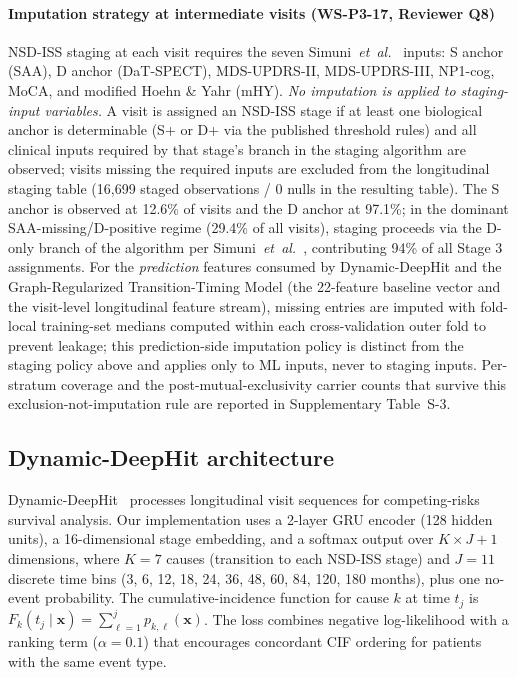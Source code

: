 \documentclass[11pt]{article}
\begin{document}
\paragraph*{Imputation strategy at intermediate visits (WS-P3-17, Reviewer Q8)} NSD-ISS staging at each visit requires the seven Simuni~\textit{et~al.}~\cite{simuni2024nsdiss} inputs: S anchor (SAA), D anchor (DaT-SPECT), MDS-UPDRS-II, MDS-UPDRS-III, NP1-cog, MoCA, and modified Hoehn \& Yahr (mHY). \emph{No imputation is applied to staging-input variables.} A visit is assigned an NSD-ISS stage if at least one biological anchor is determinable (S+ or D+ via the published threshold rules) and all clinical inputs required by that stage's branch in the staging algorithm are observed; visits missing the required inputs are excluded from the longitudinal staging table (16{,}699 staged observations / 0 nulls in the resulting table). The S anchor is observed at 12.6\% of visits and the D anchor at 97.1\%; in the dominant SAA-missing/D-positive regime (29.4\% of all visits), staging proceeds via the D-only branch of the algorithm per Simuni~\textit{et~al.}~\cite{simuni2024nsdiss}, contributing 94\% of all Stage 3 assignments. For the \emph{prediction} features consumed by Dynamic-DeepHit and the Graph-Regularized Transition-Timing Model (the 22-feature baseline vector and the visit-level longitudinal feature stream), missing entries are imputed with fold-local training-set medians computed within each cross-validation outer fold to prevent leakage; this prediction-side imputation policy is distinct from the staging policy above and applies only to ML inputs, never to staging inputs. Per-stratum coverage and the post-mutual-exclusivity carrier counts that survive this exclusion-not-imputation rule are reported in Supplementary Table~S-3.

\subsection*{Dynamic-DeepHit architecture}

Dynamic-DeepHit~\cite{lee2018deephit,lee2019} processes longitudinal visit sequences for competing-risks survival analysis. Our implementation uses a 2-layer GRU encoder (128 hidden units), a 16-dimensional stage embedding, and a softmax output over $K \times J + 1$ dimensions, where $K{=}7$ causes (transition to each NSD-ISS stage) and $J{=}11$ discrete time bins (3, 6, 12, 18, 24, 36, 48, 60, 84, 120, 180 months), plus one no-event probability. The cumulative-incidence function for cause $k$ at time $t_j$ is $F_k(t_j \mid \mathbf{x}) = \sum_{\ell=1}^{j} p_{k,\ell}(\mathbf{x})$. The loss combines negative log-likelihood with a ranking term ($\alpha{=}0.1$) that encourages concordant CIF ordering for patients with the same event type.
\end{document}
